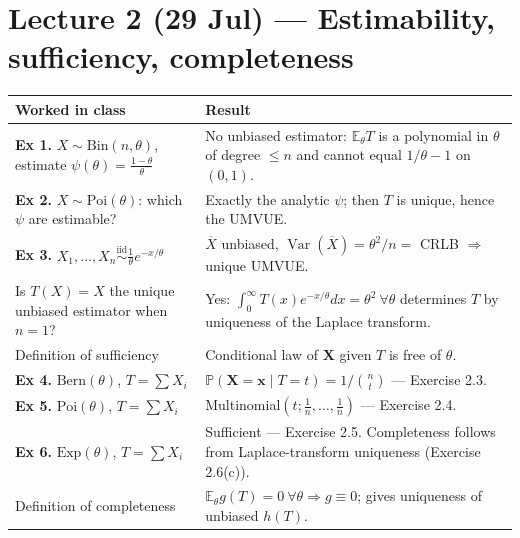 \documentclass[11pt]{article}
\newcommand{\E}{\mathbb{E}}
\newcommand{\Var}{\operatorname{Var}}
\newcommand{\Prob}{\mathbb{P}}
\newcommand{\Xbar}{\overline{X}}
\newcommand{\iid}{\overset{\text{iid}}{\sim}}
\begin{document}
\section*{Lecture 2 (29 Jul) --- Estimability, sufficiency, completeness}
\begin{longtable}{@{}p{7.2cm}p{9.0cm}@{}}
\toprule
\textbf{Worked in class} & \textbf{Result} \\
\midrule
\textbf{Ex 1.} $X\sim\mathrm{Bin}(n,\theta)$, estimate $\psi(\theta)=\tfrac{1-\theta}{\theta}$ &
No unbiased estimator: $\E_\theta T$ is a polynomial in $\theta$ of degree $\le n$ and cannot
equal $1/\theta-1$ on $(0,1)$. \\
\textbf{Ex 2.} $X\sim\mathrm{Poi}(\theta)$: which $\psi$ are estimable? &
Exactly the analytic $\psi$; then $T$ is unique, hence the UMVUE. \\
\textbf{Ex 3.} $X_1,\dots,X_n\iid\tfrac1\theta e^{-x/\theta}$ &
$\Xbar$ unbiased, $\Var(\Xbar)=\theta^2/n=$ CRLB $\Rightarrow$ unique UMVUE. \\
Is $T(X)=X$ the unique unbiased estimator when $n=1$? &
Yes: $\int_0^\infty T(x)e^{-x/\theta}dx=\theta^2\ \forall\theta$ determines $T$ by uniqueness
of the Laplace transform. \\
Definition of sufficiency &
Conditional law of $\mathbf X$ given $T$ is free of $\theta$. \\
\textbf{Ex 4.} $\mathrm{Bern}(\theta)$, $T=\sum X_i$ &
$\Prob(\mathbf X=\mathbf x\mid T=t)=1/\binom{n}{t}$ --- Exercise 2.3. \\
\textbf{Ex 5.} $\mathrm{Poi}(\theta)$, $T=\sum X_i$ &
Multinomial$(t;\tfrac1n,\dots,\tfrac1n)$ --- Exercise 2.4. \\
\textbf{Ex 6.} $\mathrm{Exp}(\theta)$, $T=\sum X_i$ &
Sufficient --- Exercise 2.5. Completeness follows from Laplace-transform uniqueness
(Exercise 2.6(c)). \\
Definition of completeness &
$\E_\theta g(T)=0\ \forall\theta\Rightarrow g\equiv0$; gives uniqueness of unbiased $h(T)$. \\
\bottomrule
\end{longtable}
\end{document}
